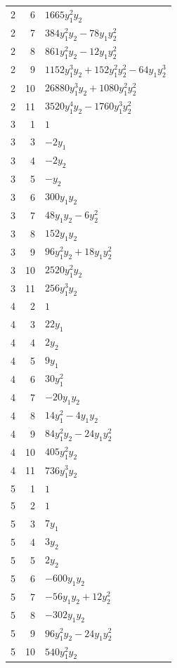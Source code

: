 \documentclass[10pt,a4paper]{article}
\begin{document}
{\begin{longtable}{rrp{125mm}}
2 & 6 & $1665 y_{1}^{2} y_{2}$\\
2 & 7 & $384 y_{1}^{2} y_{2} - 78 y_{1} y_{2}^{2}$\\
2 & 8 & $861 y_{1}^{2} y_{2} - 12 y_{1} y_{2}^{2}$\\
2 & 9 & $1152 y_{1}^{3} y_{2} + 152 y_{1}^{2} y_{2}^{2} - 64 y_{1} y_{2}^{3}$\\
2 & 10 & $26880 y_{1}^{3} y_{2} + 1080 y_{1}^{2} y_{2}^{2}$\\
2 & 11 & $3520 y_{1}^{4} y_{2} - 1760 y_{1}^{3} y_{2}^{2}$\\
3 & 1 & $1$\\
3 & 3 & $- 2 y_{1}$\\
3 & 4 & $- 2 y_{2}$\\
3 & 5 & $- y_{2}$\\
3 & 6 & $300 y_{1} y_{2}$\\
3 & 7 & $48 y_{1} y_{2} - 6 y_{2}^{2}$\\
3 & 8 & $152 y_{1} y_{2}$\\
3 & 9 & $96 y_{1}^{2} y_{2} + 18 y_{1} y_{2}^{2}$\\
3 & 10 & $2520 y_{1}^{2} y_{2}$\\
3 & 11 & $256 y_{1}^{3} y_{2}$\\
4 & 2 & $1$\\
4 & 3 & $22 y_{1}$\\
4 & 4 & $2 y_{2}$\\
4 & 5 & $9 y_{1}$\\
4 & 6 & $30 y_{1}^{2}$\\
4 & 7 & $- 20 y_{1} y_{2}$\\
4 & 8 & $14 y_{1}^{2} - 4 y_{1} y_{2}$\\
4 & 9 & $84 y_{1}^{2} y_{2} - 24 y_{1} y_{2}^{2}$\\
4 & 10 & $405 y_{1}^{2} y_{2}$\\
4 & 11 & $736 y_{1}^{3} y_{2}$\\
5 & 1 & $1$\\
5 & 2 & $1$\\
5 & 3 & $7 y_{1}$\\
5 & 4 & $3 y_{2}$\\
5 & 5 & $2 y_{2}$\\
5 & 6 & $- 600 y_{1} y_{2}$\\
5 & 7 & $- 56 y_{1} y_{2} + 12 y_{2}^{2}$\\
5 & 8 & $- 302 y_{1} y_{2}$\\
5 & 9 & $96 y_{1}^{2} y_{2} - 24 y_{1} y_{2}^{2}$\\
5 & 10 & $540 y_{1}^{2} y_{2}$\\

\end{longtable}}
\end{document}
